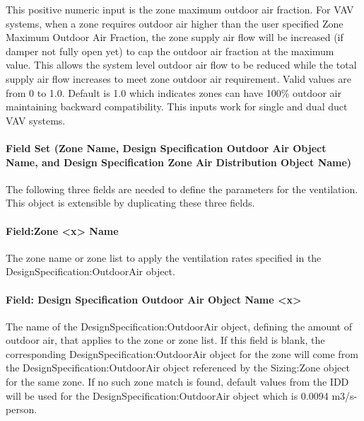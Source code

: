 This positive numeric input is the zone maximum outdoor air fraction. For VAV systems, when a zone requires outdoor air higher than the user specified Zone Maximum Outdoor Air Fraction, the zone supply air flow will be increased (if damper not fully open yet) to cap the outdoor air fraction at the maximum value. This allows the system level outdoor air flow to be reduced while the total supply air flow increases to meet zone outdoor air requirement. Valid values are from 0 to 1.0. Default is 1.0 which indicates zones can have 100\% outdoor air maintaining backward compatibility. This inputs work for single and dual duct VAV systems.

\paragraph{Field Set (Zone Name, Design Specification Outdoor Air Object Name, and Design Specification Zone Air Distribution Object Name)}\label{field-set-zone-name-design-specification-outdoor-air-object-name-and-design-specification-zone-air-distribution-object-name}

The following three fields are needed to define the parameters for the ventilation. This object is extensible by duplicating these three fields.

\paragraph{Field:Zone \textless{}x\textgreater{} Name}\label{fieldzone-x-name}

The zone name or zone list to apply the ventilation rates specified in the DesignSpecification:OutdoorAir object.

\paragraph{Field: Design Specification Outdoor Air Object Name \textless{}x\textgreater{}}\label{field-design-specification-outdoor-air-object-name-x}

The name of the DesignSpecification:OutdoorAir object, defining the amount of outdoor air, that applies to the zone or zone list. If this field is blank, the corresponding DesignSpecification:OutdoorAir object for the zone will come from the DesignSpecification:OutdoorAir object referenced by the Sizing:Zone object for the same zone. If no such zone match is found, default values from the IDD will be used for the DesignSpecification:OutdoorAir object which is 0.0094 m3/s-person. 

